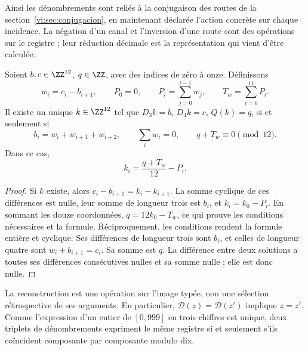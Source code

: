 Ainsi les dénombrements sont reliés à la conjugaison des routes de la
section~\ref{vi:sec:conjugacion}, en maintenant déclarée l’action
concrète sur chaque incidence. La négation d’un canal et l’inversion
d’une route sont des opérations sur le registre ; leur réduction décimale est la
représentation qui vient d’être calculée.

\begin{proposition}
\label{vi:dep:imagen-integral}
Soient \(b,c\in\ZZ^{12}\), \(q\in\ZZ\), avec des indices de zéro à onze.
Définissons
\[
 w_i=c_i-b_{i+1},\qquad P_0=0,\qquad
 P_i=\sum_{j=0}^{i-1}w_j,\qquad T_w=\sum_{i=0}^{11}P_i.
\]
Il existe un unique \(k\in\ZZ^{12}\) tel que
\(D_3k=b\), \(D_4k=c\), \(Q(k)=q\), si et seulement si
\begin{equation}
 b_i=w_i+w_{i+1}+w_{i+2},\qquad
 \sum_iw_i=0,\qquad q+T_w\equiv0\pmod{12}.
 \label{vi:dep:condiciones-imagen}
\end{equation}
Dans ce cas,
\begin{equation}
 k_i=\frac{q+T_w}{12}-P_i.
 \label{vi:dep:inversa-incidencial}
\end{equation}
\end{proposition}
\begin{proof}
Si \(k\) existe, alors
\(c_i-b_{i+1}=k_i-k_{i+1}\). La somme cyclique de ces différences
est nulle, leur somme de longueur trois est \(b_i\), et
\(k_i=k_0-P_i\). En sommant les douze coordonnées,
\(q=12k_0-T_w\), ce qui prouve les conditions nécessaires et la formule.
Réciproquement, les conditions rendent la formule entière et
cyclique. Ses différences de longueur trois sont \(b_i\), et celles de
longueur quatre sont \(w_i+b_{i+1}=c_i\). Sa somme est \(q\).
La différence entre deux solutions a toutes ses différences
consécutives nulles et sa somme nulle ; elle est donc nulle.
\end{proof}

La reconstruction est une opération sur l’image typée, non une
sélection rétrospective de ses arguments. En particulier,
\(\mathcal D(z)=\mathcal D(z')\) implique \(z=z'\).
Comme l’expression d’un entier de \([0,999]\) en trois chiffres est unique,
deux triplets de dénombrements expriment le même registre si et seulement s’ils coïncident
composante par composante modulo dix.

